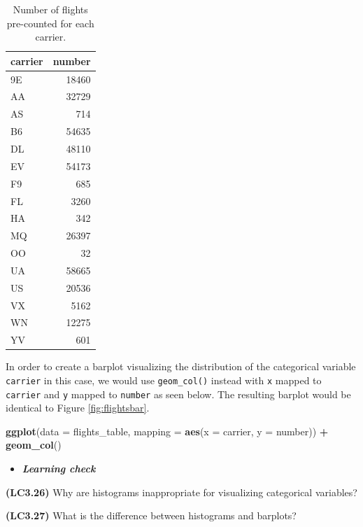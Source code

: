 \documentclass[12pt, krantz2,]{krantz}
\makeatletter
\newenvironment{Shaded}{\begin{snugshade}}{\end{snugshade}}
\newcommand{\DataTypeTok}[1]{\textcolor[rgb]{0.27,0.27,0.27}{#1}}
\newcommand{\KeywordTok}[1]{\textcolor[rgb]{0.27,0.27,0.27}{\textbf{#1}}}
\newcommand{\NormalTok}[1]{#1}
\newcommand{\OperatorTok}[1]{\textcolor[rgb]{0.43,0.43,0.43}{\textbf{#1}}}
\newcommand{\StringTok}[1]{\textcolor[rgb]{0.5,0.5,0.5}{#1}}
\newenvironment{kframe}{%
\medskip{}
\setlength{\fboxsep}{.8em}
 \def\at@end@of@kframe{}%
 \ifinner\ifhmode%
  \def\at@end@of@kframe{\end{minipage}}%
  \begin{minipage}{\columnwidth}%
 \fi\fi%
 \def\FrameCommand##1{\hskip\@totalleftmargin \hskip-\fboxsep
 \colorbox{shadecolor}{##1}\hskip-\fboxsep
     \hskip-\linewidth \hskip-\@totalleftmargin \hskip\columnwidth}%
 \MakeFramed {\advance\hsize-\width
   \@totalleftmargin\z@ \linewidth\hsize
   \@setminipage}}%
 {\par\unskip\endMakeFramed%
 \at@end@of@kframe}
\renewenvironment{Shaded}{\begin{kframe}}{\end{kframe}}
\newenvironment{rmdblock}[1]
  {\begin{shaded*}
  \begin{itemize}
  \renewcommand{\labelitemi}{
    \raisebox{-.7\height}[0pt][0pt]{
    }
  }
  \item
  }
  {
  \end{itemize}
  \end{shaded*}
  }
\newenvironment{learncheck}
  {\begin{rmdblock}{warning}}
  {\end{rmdblock}}
\makeatother
\begin{document}
\begingroup\fontsize{10}{12}\selectfont

\begin{longtable}{lr}
\caption{\label{tab:flights-counted}Number of flights pre-counted for each carrier.}\\
\toprule
carrier & number\\
\midrule
9E & 18460\\
AA & 32729\\
AS & 714\\
B6 & 54635\\
DL & 48110\\
\addlinespace
EV & 54173\\
F9 & 685\\
FL & 3260\\
HA & 342\\
MQ & 26397\\
\addlinespace
OO & 32\\
UA & 58665\\
US & 20536\\
VX & 5162\\
WN & 12275\\
\addlinespace
YV & 601\\
\bottomrule
\end{longtable}
\endgroup{}

In order to create a barplot visualizing the distribution of the categorical variable \texttt{carrier} in this case, we would use \texttt{geom\_col()} instead with \texttt{x} mapped to \texttt{carrier} and \texttt{y} mapped to \texttt{number} as seen below. The resulting barplot would be identical to Figure \ref{fig:flightsbar}.

\begin{Shaded}
\begin{Highlighting}[]
\KeywordTok{ggplot}\NormalTok{(}\DataTypeTok{data =}\NormalTok{ flights_table, }\DataTypeTok{mapping =} \KeywordTok{aes}\NormalTok{(}\DataTypeTok{x =}\NormalTok{ carrier, }\DataTypeTok{y =}\NormalTok{ number)) }\OperatorTok{+}
\StringTok{  }\KeywordTok{geom_col}\NormalTok{()}
\end{Highlighting}
\end{Shaded}

\begin{learncheck}
\textbf{\emph{Learning check}}
\end{learncheck}

\textbf{(LC3.26)} Why are histograms inappropriate for visualizing categorical variables?

\textbf{(LC3.27)} What is the difference between histograms and barplots?
\end{document}
